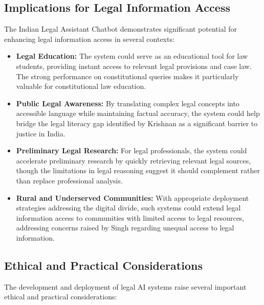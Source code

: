 \documentclass[conference]{IEEEtran}
\begin{document}
\subsection{Implications for Legal Information Access}

The Indian Legal Assistant Chatbot demonstrates significant potential for enhancing legal information access in several contexts:

\begin{itemize}
    \item \textbf{Legal Education:} The system could serve as an educational tool for law students, providing instant access to relevant legal provisions and case law. The strong performance on constitutional queries makes it particularly valuable for constitutional law education.
    
    \item \textbf{Public Legal Awareness:} By translating complex legal concepts into accessible language while maintaining factual accuracy, the system could help bridge the legal literacy gap identified by Krishnan \cite{krishnan2014} as a significant barrier to justice in India.
    
    \item \textbf{Preliminary Legal Research:} For legal professionals, the system could accelerate preliminary research by quickly retrieving relevant legal sources, though the limitations in legal reasoning suggest it should complement rather than replace professional analysis.
    
    \item \textbf{Rural and Underserved Communities:} With appropriate deployment strategies addressing the digital divide, such systems could extend legal information access to communities with limited access to legal resources, addressing concerns raised by Singh \cite{singh2020} regarding unequal access to legal information.
\end{itemize}

\subsection{Ethical and Practical Considerations}

The development and deployment of legal AI systems raise several important ethical and practical considerations:
\end{document}
